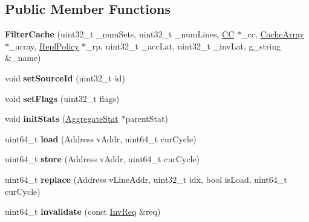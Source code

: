 \subsection*{Public Member Functions}
\begin{DoxyCompactItemize}
\item 
\hypertarget{classFilterCache_aad9b5f5c9edfaa5e32f18c31a58bdd51}{{\bfseries Filter\-Cache} (uint32\-\_\-t \-\_\-num\-Sets, uint32\-\_\-t \-\_\-num\-Lines, \hyperlink{classCC}{C\-C} $\ast$\-\_\-cc, \hyperlink{classCacheArray}{Cache\-Array} $\ast$\-\_\-array, \hyperlink{classReplPolicy}{Repl\-Policy} $\ast$\-\_\-rp, uint32\-\_\-t \-\_\-acc\-Lat, uint32\-\_\-t \-\_\-inv\-Lat, g\-\_\-string \&\-\_\-name)}\label{classFilterCache_aad9b5f5c9edfaa5e32f18c31a58bdd51}

\item 
\hypertarget{classFilterCache_ade026c14eeb800335f9648563da9f6ed}{void {\bfseries set\-Source\-Id} (uint32\-\_\-t id)}\label{classFilterCache_ade026c14eeb800335f9648563da9f6ed}

\item 
\hypertarget{classFilterCache_a31a9f6cfc6b1e0374d1ddc104677a922}{void {\bfseries set\-Flags} (uint32\-\_\-t flags)}\label{classFilterCache_a31a9f6cfc6b1e0374d1ddc104677a922}

\item 
\hypertarget{classFilterCache_a8da6656008a754aad50e3784a2d7a667}{void {\bfseries init\-Stats} (\hyperlink{classAggregateStat}{Aggregate\-Stat} $\ast$parent\-Stat)}\label{classFilterCache_a8da6656008a754aad50e3784a2d7a667}

\item 
\hypertarget{classFilterCache_a1bd3192311a095740da165e296e0bb80}{uint64\-\_\-t {\bfseries load} (Address v\-Addr, uint64\-\_\-t cur\-Cycle)}\label{classFilterCache_a1bd3192311a095740da165e296e0bb80}

\item 
\hypertarget{classFilterCache_a919b949716858aafa3f2942c84aa4212}{uint64\-\_\-t {\bfseries store} (Address v\-Addr, uint64\-\_\-t cur\-Cycle)}\label{classFilterCache_a919b949716858aafa3f2942c84aa4212}

\item 
\hypertarget{classFilterCache_acedfa30e1ab154f2eac586cadc1dd96b}{uint64\-\_\-t {\bfseries replace} (Address v\-Line\-Addr, uint32\-\_\-t idx, bool is\-Load, uint64\-\_\-t cur\-Cycle)}\label{classFilterCache_acedfa30e1ab154f2eac586cadc1dd96b}

\item 
\hypertarget{classFilterCache_abbcca6a956003c482303421aa0638da1}{uint64\-\_\-t {\bfseries invalidate} (const \hyperlink{structInvReq}{Inv\-Req} \&req)}\label{classFilterCache_abbcca6a956003c482303421aa0638da1}


\end{DoxyCompactItemize}
